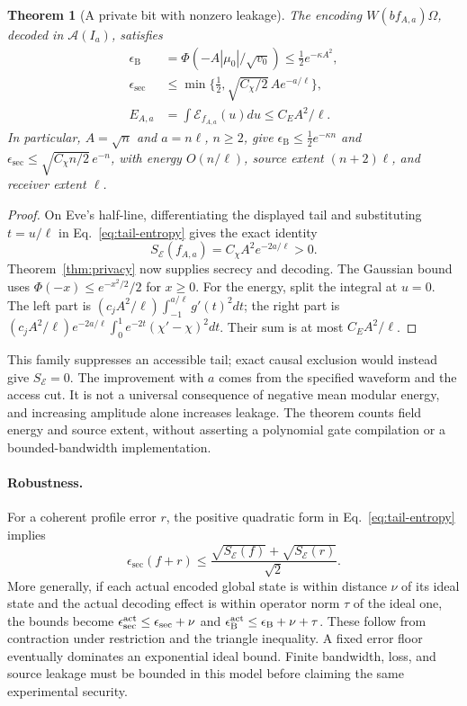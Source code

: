 \documentclass[11pt,a4paper]{article}
\newtheorem{theorem}{Theorem}
\newcommand{\A}{\mathcal A}
\newcommand{\E}{\mathcal E}
\newcommand{\ssec}{\epsilon_{\mathrm{sec}}}
\newcommand{\eB}{\epsilon_{\mathrm B}}
\begin{document}
\begin{theorem}[A private bit with nonzero leakage]
\label{thm:family}
The encoding $W(bf_{A,a})\Omega$, decoded in $\A(I_a)$, satisfies
\begin{align}
\eB&=\Phi(-A|\mu_0|/\sqrt{v_0})\le\tfrac12e^{-\kappa A^2},\\
\ssec&\le\min\{\tfrac12,\sqrt{C_\chi/2}\,A e^{-a/\ell}\},\label{eq:family-security}\\
E_{A,a}&=\int\mathcal E_{f_{A,a}}(u)du\le C_E A^2/\ell.
\end{align}
In particular, $A=\sqrt n$ and $a=n\ell$, $n\ge2$, give
$\eB\le\tfrac12e^{-\kappa n}$ and
$\ssec\le\sqrt{C_\chi n/2}\,e^{-n}$, with energy $O(n/\ell)$,
source extent $(n+2)\ell$, and receiver extent $\ell$.
\end{theorem}

\begin{proof}
On Eve's half-line, differentiating the displayed tail and substituting
$t=u/\ell$ in Eq.~\eqref{eq:tail-entropy} gives the exact identity
\begin{equation}
S_{\E}(f_{A,a})=C_\chi A^2 e^{-2a/\ell}>0.
\label{eq:explicit-leakage}
\end{equation}
Theorem~\ref{thm:privacy} now supplies secrecy and decoding. The Gaussian
bound uses $\Phi(-x)\le e^{-x^2/2}/2$ for $x\ge0$. For the energy, split
the integral at $u=0$. The left part is
$(c_j A^2/\ell)\int_{-1}^{a/\ell}g'(t)^2dt$; the right part is
$(c_j A^2/\ell)e^{-2a/\ell}\int_0^1e^{-2t}(\chi'-\chi)^2dt$.
Their sum is at most $C_E A^2/\ell$.
\end{proof}

This family suppresses an accessible tail; exact causal exclusion would
instead give $S_{\E}=0$. The improvement with $a$ comes from the specified
waveform and the access cut. It is not a universal consequence of negative
mean modular energy, and increasing amplitude alone increases leakage.
The theorem counts field energy and source extent, without asserting a
polynomial gate compilation or a bounded-bandwidth implementation.

\paragraph{Robustness.}
For a coherent profile error $r$, the positive quadratic form in
Eq.~\eqref{eq:tail-entropy} implies
\begin{equation}
\ssec(f+r)\le
\frac{\sqrt{S_{\E}(f)}+\sqrt{S_{\E}(r)}}{\sqrt2}.
\label{eq:profile-error}
\end{equation}
More generally, if each actual encoded global state is within distance
$\nu$ of its ideal state and the actual decoding effect is within operator
norm $\tau$ of the ideal one, the bounds become
$\ssec^{\rm act}\le\ssec+\nu$ and
$\eB^{\rm act}\le\eB+\nu+\tau$.
These follow from contraction under restriction and the triangle inequality.
A fixed error floor eventually dominates an exponential ideal bound.
Finite bandwidth, loss, and source leakage must be bounded in this model
before claiming the same experimental security.
\end{document}
